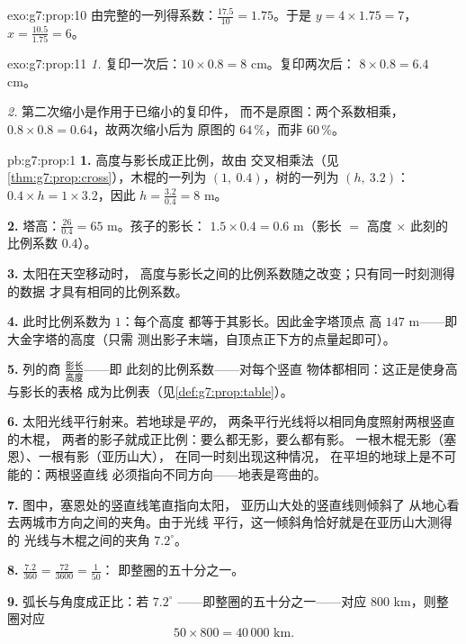 \begin{solution}{exo:g7:prop:10}
由完整的一列得系数：$\frac{17.5}{10} = 1.75$。于是
$y = 4 \times 1.75 = 7$，$x = \frac{10.5}{1.75} = 6$。
\end{solution}

\begin{solution}{exo:g7:prop:11}
\emph{1.} 复印一次后：$10 \times 0.8 = 8$ cm。复印两次后：
$8 \times 0.8 = 6.4$ cm。

\emph{2.} 第二次缩小是作用于已缩小的复印件，
而不是原图：两个系数相乘，
$0.8 \times 0.8 = 0.64$，故两次缩小后为
原图的 $64\,\%$，而非 $60\,\%$。
\end{solution}

\begin{solution}{pb:g7:prop:1}
\textbf{1.} 高度与影长成正比例，故由
交叉相乘法（见\cref{thm:g7:prop:cross}），木棍的一列为
$(1,\ 0.4)$，树的一列为 $(h,\ 3.2)$：
$0.4 \times h = 1 \times 3.2$，因此
$h = \frac{3.2}{0.4} = 8$ m。

\textbf{2.} 塔高：$\frac{26}{0.4} = 65$ m。孩子的影长：
$1.5 \times 0.4 = 0.6$ m（影长 $=$ 高度 $\times$ 此刻的
比例系数 $0.4$）。

\textbf{3.} 太阳在天空移动时，
高度与影长之间的比例系数随之改变；只有同一时刻测得的数据
才具有相同的比例系数。

\textbf{4.} 此时比例系数为 $1$：每个高度
都等于其影长。因此金字塔顶点
高 $147$ m——即大金字塔的高度（只需
测出影子末端，自顶点正下方的点量起即可）。

\textbf{5.} 列的商
$\frac{\text{影长}}{\text{高度}}$——即
此刻的比例系数——对每个竖直
物体都相同：这正是使身高与影长的表格
成为比例表（见\cref{def:g7:prop:table}）。

\textbf{6.} 太阳光线平行射来。若地球是\emph{平的}，
两条平行光线将以相同角度照射两根竖直的木棍，
两者的影子就成正比例：要么都无影，要么都有影。
一根木棍无影（塞恩）、一根有影（亚历山大），
在同一时刻出现这种情况，
在平坦的地球上是不可能的：两根竖直线
必须指向不同方向——地表是弯曲的。

\textbf{7.} 图中，塞恩处的竖直线笔直指向太阳，
亚历山大处的竖直线则倾斜了
从地心看去两城市方向之间的夹角。由于光线
平行，这一倾斜角恰好就是在亚历山大测得的
光线与木棍之间的夹角 $7.2^\circ$。

\textbf{8.} $\frac{7.2}{360} = \frac{72}{3600} = \frac{1}{50}$：
即整圈的五十分之一。

\textbf{9.} 弧长与角度成正比：若
$7.2^\circ$ ——即整圈的五十分之一——对应
$800$ km，则整圈对应
\[
50 \times 800 = 40\,000 \text{ km}.
\]


\end{solution}
